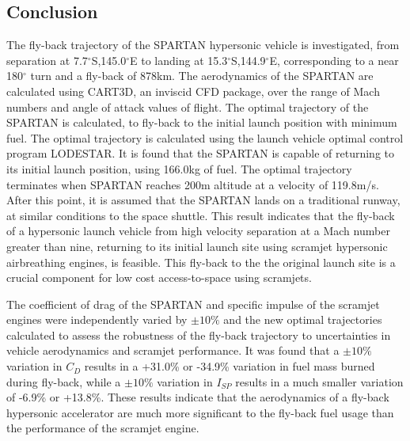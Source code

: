 \subsection{Conclusion}
The fly-back trajectory of the SPARTAN hypersonic vehicle is investigated, from separation at 7.7$^\circ$S,145.0$^\circ$E to landing at 15.3$^\circ$S,144.9$^\circ$E, corresponding to a near 180$^\circ$ turn and a fly-back of 878km. The aerodynamics of the SPARTAN are calculated using CART3D, an inviscid CFD package, over the range of Mach numbers and angle of attack values of flight. The optimal trajectory of the SPARTAN is calculated, to fly-back to the initial launch position with minimum fuel. The optimal trajectory is calculated using the launch vehicle optimal control program LODESTAR. It is found that the SPARTAN is capable of returning to its initial launch position, using 166.0kg of fuel. The optimal trajectory terminates when SPARTAN reaches 200m altitude at a velocity of 119.8m/s. After this point, it is assumed that the SPARTAN lands on a traditional runway, at similar conditions to the space shuttle.  
This result indicates that the fly-back of a hypersonic launch vehicle from high velocity separation at a Mach number greater than nine, returning to its initial launch site using scramjet hypersonic airbreathing engines, is feasible. This fly-back to the the original launch site is a crucial component for low cost access-to-space using scramjets. 

The coefficient of drag of the SPARTAN and specific impulse of the scramjet engines were independently varied by $\pm10\%$ and the new optimal trajectories calculated to assess the robustness of the fly-back trajectory to uncertainties in vehicle aerodynamics and scramjet performance. It was found that a $\pm10\%$ variation in $C_D$ results in a +31.0\% or -34.9\% variation in fuel mass burned during fly-back, while a $\pm10\%$ variation in $I_{SP}$ results in a much smaller variation of -6.9\% or +13.8\%. These results indicate that the aerodynamics of a fly-back hypersonic accelerator are much more significant to the fly-back fuel usage than the performance of the scramjet engine. 

